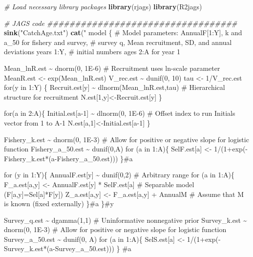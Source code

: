 \documentclass[
]{krantz}
\makeatletter
\newenvironment{Shaded}{\begin{snugshade}}{\end{snugshade}}
\newcommand{\CommentTok}[1]{\textcolor[rgb]{0.37,0.37,0.37}{\textit{#1}}}
\newcommand{\FunctionTok}[1]{\textcolor[rgb]{0.27,0.27,0.27}{\textbf{#1}}}
\newcommand{\NormalTok}[1]{#1}
\newcommand{\StringTok}[1]{\textcolor[rgb]{0.5,0.5,0.5}{#1}}
\newenvironment{kframe}{%
\medskip{}
\setlength{\fboxsep}{.8em}
 \def\at@end@of@kframe{}%
 \ifinner\ifhmode%
  \def\at@end@of@kframe{\end{minipage}}%
  \begin{minipage}{\columnwidth}%
 \fi\fi%
 \def\FrameCommand##1{\hskip\@totalleftmargin \hskip-\fboxsep
 \colorbox{shadecolor}{##1}\hskip-\fboxsep
     \hskip-\linewidth \hskip-\@totalleftmargin \hskip\columnwidth}%
 \MakeFramed {\advance\hsize-\width
   \@totalleftmargin\z@ \linewidth\hsize
   \@setminipage}}%
 {\par\unskip\endMakeFramed%
 \at@end@of@kframe}
\renewenvironment{Shaded}{\begin{kframe}}{\end{kframe}}
\makeatother
\begin{document}
\begin{Shaded}
\begin{Highlighting}[]
\CommentTok{\# Load necessary library packages}
\FunctionTok{library}\NormalTok{(rjags)}
\FunctionTok{library}\NormalTok{(R2jags)}

\CommentTok{\# JAGS code \#\#\#\#\#\#\#\#\#\#\#\#\#\#\#\#\#\#\#\#\#\#\#\#\#\#\#\#\#\#\#\#\#\#}
\FunctionTok{sink}\NormalTok{(}\StringTok{"CatchAge.txt"}\NormalTok{)}
\FunctionTok{cat}\NormalTok{(}\StringTok{"}
\StringTok{model \{}
\StringTok{\# Model parameters: AnnualF[1:Y], k and a\_50 for fishery and survey, }
\StringTok{\# survey q, Mean recruitment, SD, and annual deviations years 1:Y,}
\StringTok{\# initial numbers ages 2:A for year 1}

\StringTok{ Mean\_lnR.est \textasciitilde{} dnorm(0, 1E{-}6)}
\StringTok{   \# Recruitment uses ln{-}scale parameter}
\StringTok{ MeanR.est \textless{}{-} exp(Mean\_lnR.est)}
\StringTok{ V\_rec.est \textasciitilde{} dunif(0, 10)}
\StringTok{ tau \textless{}{-} 1/V\_rec.est}
\StringTok{ for(y in 1:Y) \{}
\StringTok{    Recruit.est[y] \textasciitilde{} dlnorm(Mean\_lnR.est,tau)}
\StringTok{     \# Hierarchical structure for recruitment}
\StringTok{    N.est[1,y]\textless{}{-}Recruit.est[y] \}}

\StringTok{    for(a in 2:A)\{}
\StringTok{      Initial.est[a{-}1] \textasciitilde{} dlnorm(0, 1E{-}6)}
\StringTok{        \# Offset index to run Initials vector from 1 to A{-}1}
\StringTok{    N.est[a,1]\textless{}{-}Initial.est[a{-}1] \}}

\StringTok{Fishery\_k.est \textasciitilde{} dnorm(0, 1E{-}3)}
\StringTok{  \# Allow for positive or negative slope for logistic function}
\StringTok{Fishery\_a\_50.est \textasciitilde{} dunif(0,A)}
\StringTok{for (a in 1:A)\{}
\StringTok{  SelF.est[a] \textless{}{-} 1/(1+exp({-}Fishery\_k.est*(a{-}Fishery\_a\_50.est)))}
\StringTok{  \}\#a}

\StringTok{for (y in 1:Y)\{}
\StringTok{  AnnualF.est[y] \textasciitilde{} dunif(0,2) \# Arbitrary range}
\StringTok{  for (a in 1:A)\{}
\StringTok{    F\_a.est[a,y] \textless{}{-} AnnualF.est[y] * SelF.est[a]}
\StringTok{      \# Separable model (F[a,y]=Sel[a]*F[y])}
\StringTok{    Z\_a.est[a,y] \textless{}{-} F\_a.est[a,y] + AnnualM}
\StringTok{      \# Assume that M is known (fixed externally)}
\StringTok{  \}\#a}
\StringTok{\}\#y}

\StringTok{Survey\_q.est \textasciitilde{} dgamma(1,1) \# Uninformative nonnegative prior}
\StringTok{Survey\_k.est \textasciitilde{} dnorm(0, 1E{-}3)}
\StringTok{  \# Allow for positive or negative slope for logistic function}
\StringTok{Survey\_a\_50.est \textasciitilde{} dunif(0, A)}
\StringTok{for (a in 1:A)\{}
\StringTok{  SelS.est[a] \textless{}{-} 1/(1+exp({-}Survey\_k.est*(a{-}Survey\_a\_50.est)))}
\StringTok{  \} \#a}


\end{Highlighting}
\end{Shaded}
\end{document}
